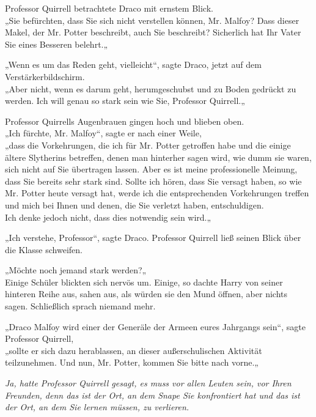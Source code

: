 {Professor Quirrell betrachtete Draco mit ernstem Blick.\\ „Sie befürchten, dass Sie sich nicht verstellen können, Mr. Malfoy? Dass dieser Makel, der Mr. Potter beschreibt, auch Sie beschreibt? Sicherlich hat Ihr Vater Sie eines Besseren belehrt.„

„Wenn es um das Reden geht, vielleicht“, sagte Draco, jetzt auf dem Verstärkerbildschirm.\\ „Aber nicht, wenn es darum geht, herumgeschubst und zu Boden gedrückt zu werden. Ich will genau so stark sein wie Sie, Professor Quirrell.„

Professor Quirrells Augenbrauen gingen hoch und blieben oben.\\ „Ich fürchte, Mr. Malfoy“, sagte er nach einer Weile,\\ „dass die Vorkehrungen, die ich für Mr. Potter getroffen habe und die einige ältere Slytherins betreffen, denen man hinterher sagen wird, wie dumm sie waren, sich nicht auf Sie übertragen lassen. Aber es ist meine professionelle Meinung, dass Sie bereits sehr stark sind. Sollte ich hören, dass Sie versagt haben, so wie Mr. Potter heute versagt hat, werde ich die entsprechenden Vorkehrungen treffen und mich bei Ihnen und denen, die Sie verletzt haben, entschuldigen.\\ Ich denke jedoch nicht, dass dies notwendig sein wird.„

„Ich verstehe, Professor“, sagte Draco. Professor Quirrell ließ seinen Blick über die Klasse schweifen.

„Möchte noch jemand stark werden?„\\ Einige Schüler blickten sich nervös um. Einige, so dachte Harry von seiner hinteren Reihe aus, sahen aus, als würden sie den Mund öffnen, aber nichts sagen. Schließlich sprach niemand mehr.

„Draco Malfoy wird einer der Generäle der Armeen eures Jahrgangs sein“, sagte Professor Quirrell,\\ „sollte er sich dazu herablassen, an dieser außerschulischen Aktivität teilzunehmen. Und nun, Mr. Potter, kommen Sie bitte nach vorne.„

\emph{Ja, hatte Professor Quirrell gesagt, es muss vor allen Leuten sein, vor Ihren Freunden, denn das ist der Ort, an dem Snape Sie konfrontiert hat und das ist der Ort, an dem Sie lernen müssen, zu verlieren.}

}
